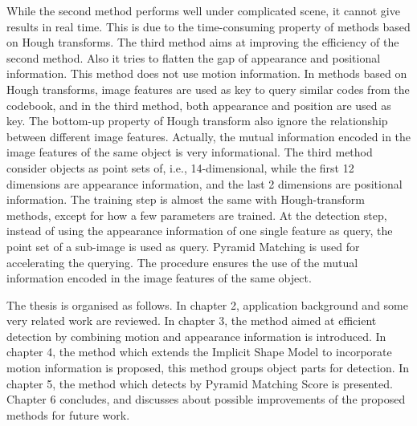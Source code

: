 While the second method performs well under complicated scene, it cannot give results in real time. This is due to the time-consuming property of methods based on Hough transforms.   The third method aims at improving the efficiency of the second method. Also it tries to flatten the gap of appearance and positional information. This method does not use motion information. In methods based on Hough transforms, image features are used as key to query similar codes from the codebook, and in the third method, both appearance and position are used as key. The bottom-up property of Hough transform also ignore the relationship between different image features. Actually, the mutual information encoded in the image features of the same object is very informational. The third method consider objects as point sets of, i.e., 14-dimensional, while the first 12 dimensions are appearance information, and the last 2 dimensions are positional information. The training step is almost the same with Hough-transform methods, except for how a few parameters are trained. At the detection step, instead of using the appearance information of one single feature as query, the point set of a sub-image is used as query. Pyramid Matching is used for accelerating the querying. The procedure ensures the use of the mutual information encoded in the image features of the same object.

The thesis is organised as follows. In chapter 2, application background and some very related work are reviewed. In chapter 3, the method aimed at efficient detection by combining motion and appearance information is introduced. In chapter 4, the method which extends the Implicit Shape Model to incorporate motion information is proposed, this method groups object parts for detection. In chapter 5, the method which detects by Pyramid Matching Score is presented. Chapter 6 concludes, and discusses about possible improvements of the proposed methods for future work.




